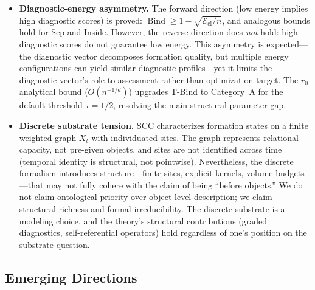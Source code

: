 \documentclass[lettersize,journal]{IEEEtran}
\DeclareMathOperator{\Bind}{Bind}
\begin{document}
\begin{itemize}
\item \textbf{Diagnostic-energy asymmetry.} The forward direction (low energy implies high diagnostic scores) is proved: $\Bind \geq 1 - \sqrt{\mathcal{E}_{\mathrm{cl}}/n}$, and analogous bounds hold for Sep and Inside. However, the reverse direction does \emph{not} hold: high diagnostic scores do not guarantee low energy. This asymmetry is expected---the diagnostic vector decomposes formation quality, but multiple energy configurations can yield similar diagnostic profiles---yet it limits the diagnostic vector's role to assessment rather than optimization target. The $\bar{r}_0$ analytical bound ($O(n^{-1/d})$) upgrades T-Bind to Category~A for the default threshold $\tau = 1/2$, resolving the main structural parameter gap.

\item \textbf{Discrete substrate tension.} SCC characterizes formation states on a finite weighted graph $X_t$ with individuated sites. The graph represents relational capacity, not pre-given objects, and sites are not identified across time (temporal identity is structural, not pointwise). Nevertheless, the discrete formalism introduces structure---finite sites, explicit kernels, volume budgets---that may not fully cohere with the claim of being ``before objects.'' We do not claim ontological priority over object-level description; we claim structural richness and formal irreducibility. The discrete substrate is a modeling choice, and the theory's structural contributions (graded diagnostics, self-referential operators) hold regardless of one's position on the substrate question.
\end{itemize}

\subsection{Emerging Directions}
\end{document}
